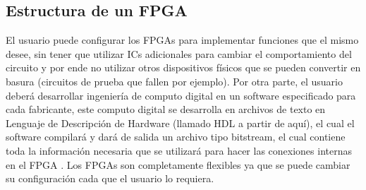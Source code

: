\documentclass[twoside,spanish,ESP,MSc]{plantillaLabUPV}
\theoremstyle{definition}
\newcommand{\f}{FPGA }
\newcommand{\fs}{FPGAs }
\begin{document}
\subsection{Estructura de un \f}%



El usuario puede configurar los \fs   para implementar funciones que el mismo desee, sin tener que utilizar ICs adicionales para cambiar el comportamiento del circuito y por ende no utilizar otros dispositivos físicos que se pueden convertir en basura (circuitos de prueba que fallen por ejemplo). Por otra parte, el usuario deberá desarrollar ingeniería de computo digital en un software especificado para cada fabricante, este computo digital se desarrolla en archivos de texto en Lenguaje de Descripción de Hardware (llamado HDL a partir de aquí), el cual el software compilará y dará de salida un archivo tipo bitstream, el cual contiene toda la información necesaria que se utilizará para hacer las conexiones internas en el \f. Los \fs son completamente flexibles ya que se puede cambiar su configuración cada que el usuario lo requiera. 

\end{document}
